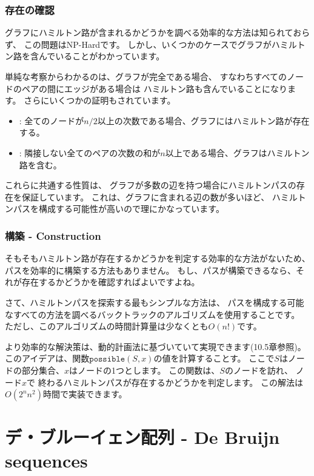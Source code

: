 \subsubsection{存在の確認}

グラフにハミルトン路が含まれるかどうかを調べる効率的な方法は知られておらず、
この問題はNP-Hardです。
しかし、いくつかのケースでグラフがハミルトン路を含んでいることがわかっています。

単純な考察からわかるのは、グラフが完全である場合、
すなわちすべてのノー ドのペアの間にエッジがある場合は
ハミルトン路も含んでいることになります。
さらにいくつかの証明もされています。

\begin{itemize}
\item
{}
: %
全てのノードが$n/2$以上の次数である場合、グラフにはハミルトン路が存在する。
\item
{}
: %
隣接しない全てのペアの次数の和が$n$以上である場合、グラフはハミルトン路を含む。
\end{itemize}

これらに共通する性質は、
グラフが多数の辺を持つ場合にハミルトンパスの存在を保証しています。
これは、グラフに含まれる辺の数が多いほど、
ハミルトンパスを構成する可能性が高いので理にかなっています。

\subsubsection{構築 - Construction}


そもそもハミルトン路が存在するかどうかを判定する効率的な方法がないため、
パスを効率的に構築する方法もありません。
もし、パスが構築できるなら、それが存在するかどうかを確認すればよいですよね。

さて、ハミルトンパスを探索する最もシンプルな方法は、
パスを構成する可能なすべての方法を調べるバックトラックのアルゴリズムを使用することです。
ただし、このアルゴリズムの時間計算量は少なくとも$O(n!)$です。

より効率的な解決策は、動的計画法に基づいていて実現できます(10.5章参照)。
このアイデアは、関数$\texttt{possible}(S,x)$の値を計算することす。
ここで$S$はノードの部分集合、$x$はノードの1つとします。
この関数は、$S$のノードを訪れ、
ノード$x$で 終わるハミルトンパスが存在するかどうかを判定します。
この解法は$O(2^n n^2)$時間で実装できます。

\section{デ・ブルーイェン配列 - De Bruijn sequences}

